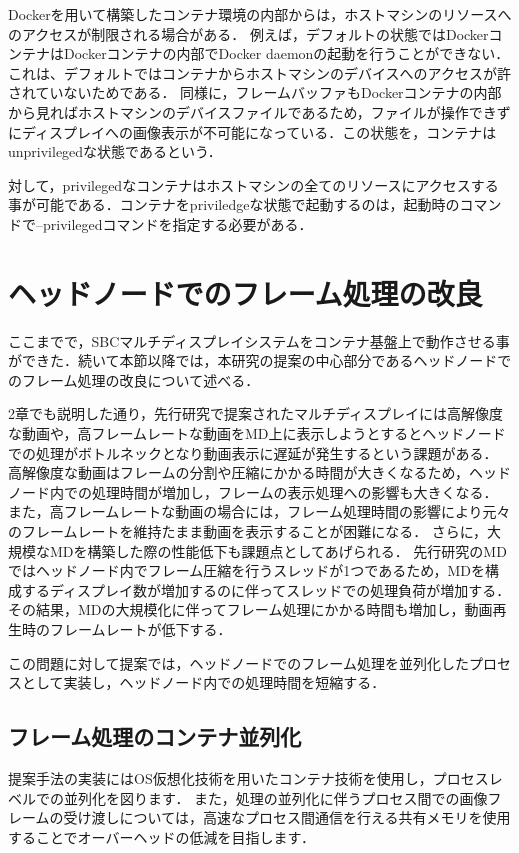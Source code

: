 Dockerを用いて構築したコンテナ環境の内部からは，ホストマシンのリソースへのアクセスが制限される場合がある．
例えば，デフォルトの状態ではDockerコンテナはDockerコンテナの内部でDocker daemonの起動を行うことができない．
これは、デフォルトではコンテナからホストマシンのデバイスへのアクセスが許されていないためである．
同様に，フレームバッファもDockerコンテナの内部から見ればホストマシンのデバイスファイルであるため，ファイルが操作できずにディスプレイへの画像表示が不可能になっている．この状態を，コンテナはunprivilegedな状態であるという．

対して，privilegedなコンテナはホストマシンの全てのリソースにアクセスする事が可能である．コンテナをpriviledgeな状態で起動するのは，起動時のコマンドで--privilegedコマンドを指定する必要がある．

\section{ヘッドノードでのフレーム処理の改良}
ここまでで，SBCマルチディスプレイシステムをコンテナ基盤上で動作させる事ができた．続いて本節以降では，本研究の提案の中心部分であるヘッドノードでのフレーム処理の改良について述べる．

2章でも説明した通り，先行研究で提案されたマルチディスプレイには高解像度な動画や，高フレームレートな動画をMD上に表示しようとするとヘッドノードでの処理がボトルネックとなり動画表示に遅延が発生するという課題がある．
高解像度な動画はフレームの分割や圧縮にかかる時間が大きくなるため，ヘッドノード内での処理時間が増加し，フレームの表示処理への影響も大きくなる．
また，高フレームレートな動画の場合には，フレーム処理時間の影響により元々のフレームレートを維持たまま動画を表示することが困難になる．
さらに，大規模なMDを構築した際の性能低下も課題点としてあげられる．
先行研究のMDではヘッドノード内でフレーム圧縮を行うスレッドが1つであるため，MDを構成するディスプレイ数が増加するのに伴ってスレッドでの処理負荷が増加する．
その結果，MDの大規模化に伴ってフレーム処理にかかる時間も増加し，動画再生時のフレームレートが低下する．

この問題に対して提案では，ヘッドノードでのフレーム処理を並列化したプロセスとして実装し，ヘッドノード内での処理時間を短縮する．

\subsection*{フレーム処理のコンテナ並列化}
提案手法の実装にはOS仮想化技術を用いたコンテナ技術を使用し，プロセスレベルでの並列化を図ります．
また，処理の並列化に伴うプロセス間での画像フレームの受け渡しについては，高速なプロセス間通信を行える共有メモリを使用することでオーバーヘッドの低減を目指します．

